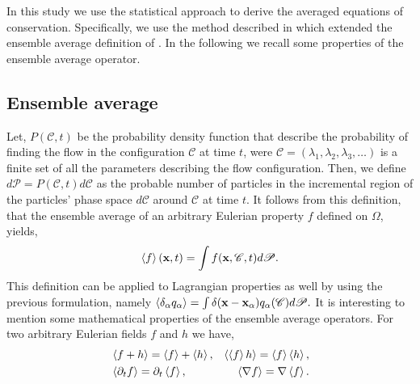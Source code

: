 In this study we use the statistical approach to derive the averaged equations of conservation. 
Specifically, we use the method described in \citet{zhang2021ensemble} which extended the ensemble average definition of \citet{batchelor1972sedimentation}. 
In the following we recall some properties of the ensemble average operator. 

\subsection{Ensemble average}

Let, $P(\mathscr{C},t)$ be the probability density function that describe the probability of finding the flow in the configuration $\mathscr{C}$ at time $t$, were $\mathscr{C} = (\lambda_1,\lambda_2,\lambda_3,\ldots)$ is a finite set of all the parameters describing the flow configuration. 
Then, we define $d\mathscr{P} = P(\mathscr{C},t)d\mathscr{C}$ as the probable number of particles in the incremental region of the particles' phase space $d\mathscr{C}$ around $\mathscr{C}$ at time $t$. 
It follows from this definition, that the ensemble average of an arbitrary Eulerian property $f$ defined on $\Omega$, yields,
\begin{equation}
    \left<f\right>(\textbf{x},t)
    =\int f(\textbf{x},\mathscr{C},t) d\mathscr{P}. 
    \label{eq:avg}
\end{equation}  
This definition can be applied to Lagrangian properties as well by using the previous formulation, namely $\left<\delta_\alpha q_\alpha\right> = \int \delta(\textbf{x} - \textbf{x}_\alpha) q_\alpha(\mathscr{C}) d\mathscr{P}. $
It is interesting to mention some mathematical properties of the ensemble average operators. 
For two arbitrary Eulerian fields $f$ and $h$ we have,
\begin{align}
    &\left<f+h\right> = \left<f\right>+\left<h\right>, 
    &\left<\left<f\right>h\right> = \left<f\right>\left<h\right>, \nonumber \\
    &\left<\partial_t f\right> 
    = \partial_t\left<f\right>, 
    &\left<\mathbf{\nabla} f\right>
    = \mathbf{\nabla} \left<f\right>. 
    \label{eq:avg_properties}
\end{align}

